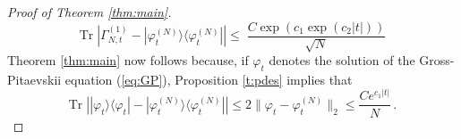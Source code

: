 \documentclass[11pt,a4paper]{article}
\newcommand{\tr}{\mbox{Tr}}
\newcommand{\cH}{{\cal H}}
\begin{document}
\begin{proof}[Proof of Theorem \ref{thm:main}]
\[  \tr \; \left| \Gamma^{(1)}_{N,t} - |\varphi^{(N)}_t \rangle \langle \varphi_t^{(N)}| \right| \leq \; \frac{C\exp (c_1 \exp (c_2 |t|))}{\sqrt{N}} \]
Theorem \ref{thm:main} now follows because, if $\varphi_t$ denotes the solution of the Gross-Pitaevskii equation (\ref{eq:GP}), Proposition \ref{t:pdes} implies that
\[ \tr \; \left| |\varphi_t \rangle \langle \varphi_t| -  |\varphi^{(N)}_t \rangle \langle \varphi^{(N)}_t| \right| \leq 2 \| \varphi_t - \varphi_t^{(N)} \|_2 \leq \frac{C e^{c_1 |t|}}{N} \, . \]
\end{proof}

\end{document}
